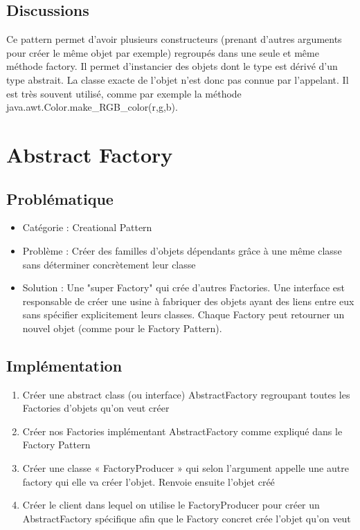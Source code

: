 \subsection{Discussions}

Ce pattern permet d'avoir plusieurs constructeurs (prenant d'autres arguments pour créer le même objet par exemple) regroupés dans une seule et même méthode factory.
Il permet d'instancier des objets dont le type est dérivé d'un type abstrait. La classe exacte de l'objet n'est donc pas connue par l'appelant.
Il est très souvent utilisé, comme par exemple la méthode java.awt.Color.make\_RGB\_color(r,g,b).





\section{Abstract Factory}
\subsection{Problématique}
\begin{itemize}
    \item Catégorie : Creational Pattern
    \item Problème : Créer des familles d'objets dépendants grâce à une même classe sans déterminer concrètement leur classe 
    \item Solution : Une "super Factory" qui crée d'autres Factories. Une interface est responsable de créer une usine à fabriquer des objets ayant des liens entre eux sans spécifier explicitement leurs classes. Chaque Factory peut retourner un nouvel objet (comme pour le Factory Pattern).
\end{itemize}
\subsection{Implémentation}
\begin{enumerate}
    \item Créer une abstract class (ou interface) AbstractFactory regroupant toutes les Factories d'objets qu'on veut créer
    \item Créer nos Factories implémentant AbstractFactory comme expliqué dans le Factory Pattern
    \item Créer une classe « FactoryProducer » qui selon l’argument appelle une autre factory qui elle va créer l’objet. Renvoie ensuite l’objet créé
    \item Créer le client dans lequel on utilise le FactoryProducer pour créer un AbstractFactory spécifique afin que le Factory concret crée l’objet qu’on veut
\end{enumerate}

